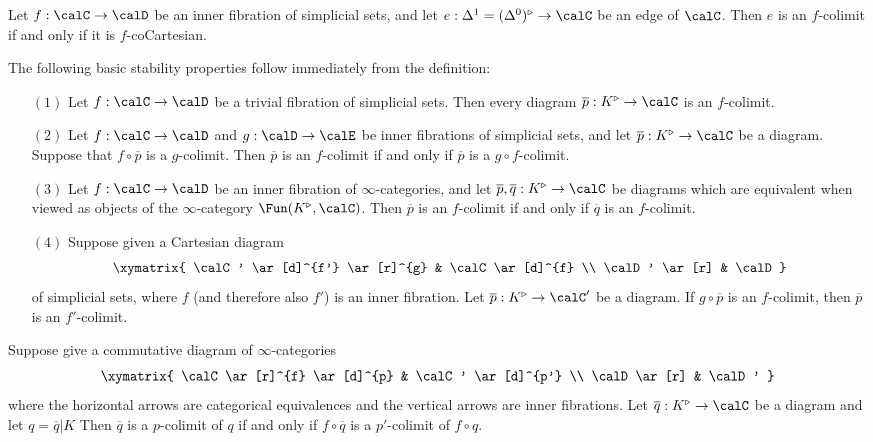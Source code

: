 \begin{example}\label{exex1}
Let $f: \calC \rightarrow \calD$ be an inner fibration of simplicial sets, and let
$e: \Delta^1 = (\Delta^0)^{\triangleright} \rightarrow \calC$ be an edge of $\calC$. Then $e$ is an $f$-colimit if and only if it is $f$-coCartesian.
\end{example}

The following basic stability properties follow immediately from the definition:

\begin{proposition}\label{basrel}
\begin{itemize}

\item[$(1)$] Let $f: \calC \rightarrow \calD$ be a trivial fibration of simplicial sets. Then
every diagram $\overline{p}: K^{\triangleright} \rightarrow \calC$ is an $f$-colimit.

\item[$(2)$] Let $f: \calC \rightarrow \calD$ and $g: \calD \rightarrow \calE$ be inner fibrations of simplicial sets, and let $\overline{p}: K^{\triangleright} \rightarrow \calC$ be a diagram.
Suppose that $f \circ \overline{p}$ is a $g$-colimit. Then $\overline{p}$ is an $f$-colimit if and only if $\overline{p}$ is a $g \circ f$-colimit.

\item[$(3)$] Let $f: \calC \rightarrow \calD$ be an inner fibration of $\infty$-categories, and let
$\overline{p}, \overline{q}: K^{\triangleright} \rightarrow \calC$ be diagrams which are equivalent when viewed as objects of the $\infty$-category $\Fun(K^{\triangleright}, \calC)$. Then $\overline{p}$ is 
an $f$-colimit if and only if $\overline{q}$ is an $f$-colimit.

\item[$(4)$] Suppose given a Cartesian diagram
$$ \xymatrix{ \calC' \ar[d]^{f'} \ar[r]^{g} & \calC \ar[d]^{f} \\
\calD' \ar[r] & \calD }$$
of simplicial sets, where $f$ (and therefore also $f'$) is an inner fibration. Let $\overline{p}: K^{\triangleright} \rightarrow \calC'$ be a diagram. If $g \circ \overline{p}$ is an $f$-colimit, then
$\overline{p}$ is an $f'$-colimit.
\end{itemize}
\end{proposition}

\begin{proposition}\label{summertoy}
Suppose give a commutative diagram of $\infty$-categories
$$ \xymatrix{ \calC \ar[r]^{f} \ar[d]^{p} & \calC' \ar[d]^{p'} \\
\calD \ar[r] & \calD' }$$
where the horizontal arrows are categorical equivalences and the vertical arrows are inner fibrations.
Let $\overline{q}: K^{\triangleright} \rightarrow \calC$ be a diagram and let $q = \overline{q}|K$
Then $\overline{q}$ is a $p$-colimit of $q$ if and only if
$f \circ \overline{q}$ is a $p'$-colimit of $f \circ q$.
\end{proposition}

